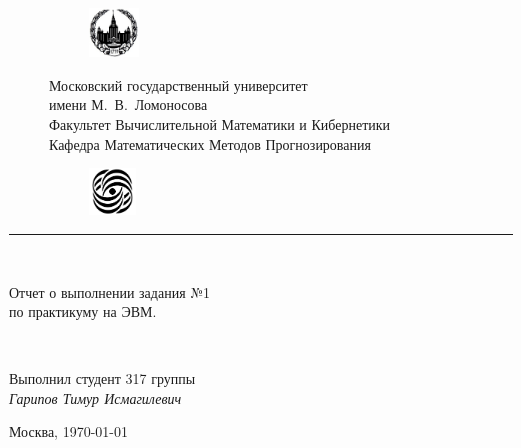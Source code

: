 \documentclass{article}
\begin{document}
\renewcommand{\thelstlisting}{\arabic{subsection}.\arabic{lstlisting}}

\begin{titlepage}

\newcommand{\HRule}{\rule{\linewidth}{0.5mm}} 
\centering 

\begin{figure}
    \centering
    \begin{subfigure}{1.5cm}
        \includegraphics[height=1.3cm]{msu.jpg}
    \end{subfigure}
    \parbox[t][0.2cm][c]{12cm}{
        \centering
        \Large Московский государственный университет \\ имени М.~В.~Ломоносова\\[0.2cm]
        \large Факультет Вычислительной Математики и Кибернетики \\[0.2cm]
        \large Кафедра Математических Методов Прогнозирования
    }
    \begin{subfigure}{1.25cm}    
        \includegraphics[height=1.25cm]{cmc.jpg}
    \end{subfigure}
\end{figure}



\HRule \\[5.5cm]
{
  \upshape

{ 
    \LARGE
    Отчет о выполнении задания №1 \\[0.3cm]
    по практикуму на ЭВМ.
}
}\\[4cm]

\begin{flushright}
{
    \large
    \parbox{0.4\textwidth}{
        Выполнил студент 317 группы \\
        \emph{Гарипов Тимур Исмагилевич}
    }
}
\end{flushright}

\vspace{9cm}
{\large Москва, \today}
 
    

\vfill

\end{titlepage}
\end{document}

